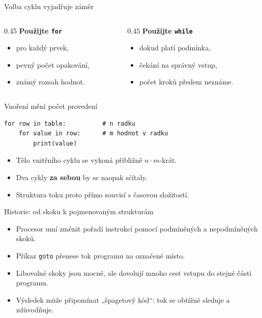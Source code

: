 \documentclass[aspectratio=169,t]{beamer}
\begin{document}
\begin{frame}{Volba cyklu vyjadřuje záměr}
  \begin{columns}[T]
    \begin{column}{0.45\textwidth}
      \textbf{Použijte \texttt{for}}
      \begin{itemize}
        \item pro každý prvek,
        \item pevný počet opakování,
        \item známý rozsah hodnot.
      \end{itemize}
    \end{column}
    \begin{column}{0.45\textwidth}
      \textbf{Použijte \texttt{while}}
      \begin{itemize}
        \item dokud platí podmínka,
        \item čekání na správný vstup,
        \item počet kroků předem neznáme.
      \end{itemize}
    \end{column}
  \end{columns}
\end{frame}

\begin{frame}[fragile]{Vnoření mění počet provedení}
\begin{lstlisting}[style=python]
for row in table:          # n radku
    for value in row:      # m hodnot v radku
        print(value)
\end{lstlisting}
  \begin{itemize}
    \item Tělo vnitřního cyklu se vykoná přibližně \(n \cdot m\)-krát.
    \item Dva cykly \textbf{za sebou} by se naopak sčítaly.
    \item Struktura toku proto přímo souvisí s časovou složitostí.
  \end{itemize}
\end{frame}

\begin{frame}{Historie: od skoku k pojmenovaným strukturám}
  \begin{itemize}
    \item Procesor umí změnit pořadí instrukcí pomocí podmíněných a nepodmíněných skoků.
    \item Příkaz \texttt{goto} přenese tok programu na označené místo.
    \item Libovolné skoky jsou mocné, ale dovolují mnoho cest vstupu do stejné části programu.
    \item Výsledek může připomínat „špagetový kód“: tok se obtížně sleduje a zdůvodňuje.
  \end{itemize}
\end{frame}
\end{document}
